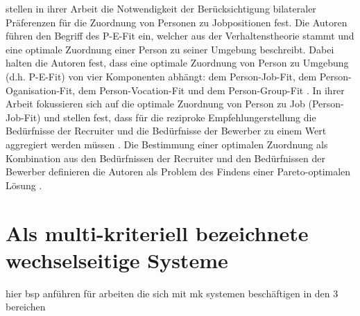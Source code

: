 \textcite[S. 1ff.]{malinowski:2006} stellen in ihrer Arbeit die Notwendigkeit der Berücksichtigung bilateraler Präferenzen für die Zuordnung von Personen zu Jobpositionen fest.
Die Autoren führen den Begriff des \ac{P-E-Fit} ein, welcher aus der Verhaltenstheorie \cite[S. 3]{malinowski:2006} stammt und eine optimale Zuordnung einer Person zu seiner Umgebung beschreibt.
Dabei halten die Autoren fest, dass eine optimale Zuordnung von Person zu Umgebung (d.h. \ac{P-E-Fit}) von vier Komponenten abhängt: dem Person-Job-Fit, dem Person-Oganisation-Fit, dem Person-Vocation-Fit und dem Person-Group-Fit \cite[S. 3]{malinowski:2006}.
In ihrer Arbeit fokussieren sich \textcite[S. 4]{malinowski:2006} auf die optimale Zuordnung von Person zu Job (Person-Job-Fit) und stellen fest, dass für die reziproke Empfehlungerstellung die Bedürfnisse der Recruiter und die Bedürfnisse der Bewerber zu einem Wert aggregiert werden müssen \cite[S. 5]{malinowski:2006}.
Die Bestimmung einer optimalen Zuordnung als Kombination aus den Bedürfnissen der Recruiter und den Bedürfnissen der Bewerber definieren die Autoren als Problem des Findens einer Pareto-optimalen Lösung \cite[S. 5]{malinowski:2006}.



\section{Als multi-kriteriell bezeichnete wechselseitige Systeme}
hier bsp anführen für arbeiten die sich mit mk systemen beschäftigen in den 3 bereichen

